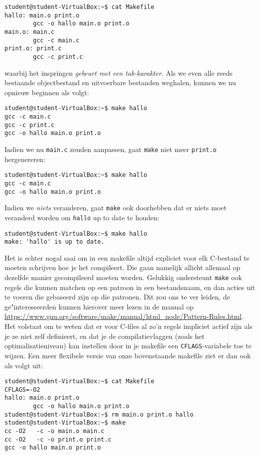 \documentclass[a4paper,twoside,openany]{memoir}
\begin{document}
\begin{verbatim}
student@student-VirtualBox:~$ cat Makefile
hallo: main.o print.o
        gcc -o hallo main.o print.o
main.o: main.c
        gcc -c main.c
print.o: print.c
        gcc -c print.c
\end{verbatim}
waarbij het inspringen \emph{gebeurt met een tab-karakter}. Als we even alle
reeds bestaande objectbestand en uitvoerbare bestanden weghalen, kunnen we nu
opnieuw beginnen als volgt:

\begin{verbatim}
student@student-VirtualBox:~$ make hallo
gcc -c main.c
gcc -c print.c
gcc -o hallo main.o print.o
\end{verbatim}

Indien we nu \verb!main.c! zouden aanpassen, gaat \verb!make! niet meer
\verb!print.o! hergenereren:

\begin{verbatim}
student@student-VirtualBox:~$ make hallo 
gcc -c main.c
gcc -o hallo main.o print.o
\end{verbatim}

Indien we \emph{niets} veranderen, gaat  \verb!make! ook doorhebben dat er niets
moet veranderd worden om \verb!hallo! up to date te houden:
\begin{verbatim}
student@student-VirtualBox:~$ make hallo 
make: 'hallo' is up to date.
\end{verbatim}

Het is echter nogal saai om in een makefile altijd expliciet voor elk C-bestand
te moeten schrijven hoe je het compileert. Die gaan namelijk allicht allemaal op
dezelfde manier gecompileerd moeten worden. Gelukkig ondersteunt \verb!make! ook
regels die kunnen matchen op een patroon in een bestandsnaam, en dan acties uit
te voeren die gebaseerd zijn op die patronen. Dit zou ons te ver leiden, de
ge"interesseerden kunnen hierover meer lezen in de manual op
\url{https://www.gnu.org/software/make/manual/html_node/Pattern-Rules.html}. Het
volstaat om te weten dat er voor C-files al zo'n regels impliciet actief zijn
als je ze niet zelf definieert, en dat je de compilatievlaggen (zoals het
optimalisatieniveau) kan instellen door in je makefile een
\verb!CFLAGS!-variabele toe te wijzen. Een meer flexibele versie van onze
bovenstaande makefile ziet er dan ook als volgt uit:

\begin{verbatim}
student@student-VirtualBox:~$ cat Makefile 
CFLAGS=-O2
hallo: main.o print.o
        gcc -o hallo main.o print.o
student@student-VirtualBox:~$ rm main.o print.o hallo 
student@student-VirtualBox:~$ make
cc -O2   -c -o main.o main.c
cc -O2   -c -o print.o print.c
gcc -o hallo main.o print.o
\end{verbatim}
\end{document}
